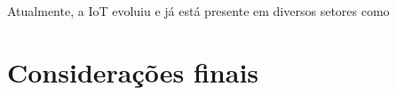 \documentclass[
	article,			%
	11pt,				%
	oneside,			%
	a4paper,			%
	section=TITLE,		%
	subsection=TITLE,	%
	english,			%
	brazil,				%
	sumario=tradicional
	]{abntex2}
\begin{document}
Atualmente, a IoT evoluiu e já está presente em diversos setores como 





% 

\section*{Considerações finais}







\end{document}

